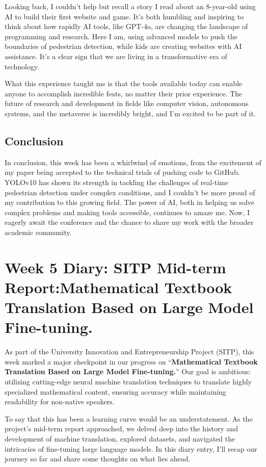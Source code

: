 \documentclass[a4paper]{article} 	%
\begin{document}
Looking back, I couldn’t help but recall a story I read about an 8-year-old using AI to build their first website and game. It’s both humbling and inspiring to think about how rapidly AI tools, like GPT-4o, are changing the landscape of programming and research. Here I am, using advanced models to push the boundaries of pedestrian detection, while kids are creating websites with AI assistance. It’s a clear sign that we are living in a transformative era of technology.

What this experience taught me is that the tools available today can enable anyone to accomplish incredible feats, no matter their prior experience. The future of research and development in fields like computer vision, autonomous systems, and the metaverse is incredibly bright, and I’m excited to be part of it.

\subsection*{Conclusion}

In conclusion, this week has been a whirlwind of emotions, from the excitement of my paper being accepted to the technical trials of pushing code to GitHub. YOLOv10 has shown its strength in tackling the challenges of real-time pedestrian detection under complex conditions, and I couldn’t be more proud of my contribution to this growing field. The power of AI, both in helping us solve complex problems and making tools accessible, continues to amaze me. Now, I eagerly await the conference and the chance to share my work with the broader academic community.

\section{Week 5 Diary: SITP Mid-term Report:Mathematical Textbook Translation Based on Large Model Fine-tuning.}

As part of the University Innovation and Entrepreneurship Project (SITP), this week marked a major checkpoint in our progress on “\textbf{Mathematical Textbook Translation Based on Large Model Fine-tuning.}” Our goal is ambitious: utilizing cutting-edge neural machine translation techniques to translate highly specialized mathematical content, ensuring accuracy while maintaining readability for non-native speakers.

To say that this has been a learning curve would be an understatement. As the project’s mid-term report approached, we delved deep into the history and development of machine translation, explored datasets, and navigated the intricacies of fine-tuning large language models. In this diary entry, I’ll recap our journey so far and share some thoughts on what lies ahead.
\end{document}
